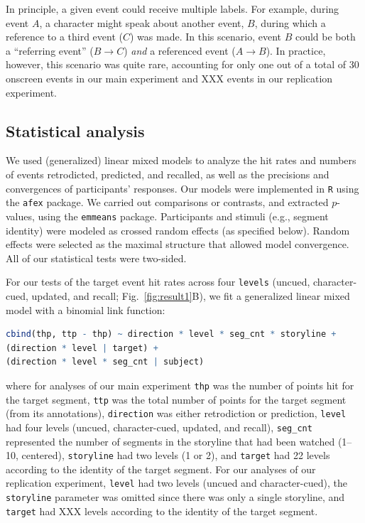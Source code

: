 \documentclass[10pt]{article}
\begin{document}
In principle, a given event could receive multiple labels. For example, during event $A$, a character might speak about another event, $B$, during which a reference to a third event ($C$) was made. In this scenario, event $B$ could be both a ``referring event'' ($B \rightarrow C$) \textit{and} a referenced event ($A \rightarrow B$). In practice, however, this scenario was quite rare, accounting for only one out of a total of 30 onscreen events in our main experiment and XXX events in our replication experiment.

\subsection*{Statistical analysis}

We used (generalized) linear mixed models to analyze the hit rates and numbers of events retrodicted, predicted, and recalled, as well as the precisions and convergences of participants' responses. Our models were implemented in \texttt{R} using the \texttt{afex} package. We carried out comparisons or contrasts, and extracted $p$-values, using the \texttt{emmeans} package. Participants and stimuli (e.g., segment identity) were modeled as crossed random effects (as specified below). Random effects were selected as the maximal structure that allowed model convergence. All of our statistical tests were two-sided.

For our tests of the target event hit rates across four \texttt{levels} (uncued, character-cued, updated, and recall; Fig.~\ref{fig:result1}B), we fit a generalized linear mixed model with a binomial link function:
\begin{lstlisting}[language=R]
  cbind(thp, ttp - thp) ~ direction * level * seg_cnt * storyline +
(direction * level | target) +
(direction * level * seg_cnt | subject)
\end{lstlisting}
where for analyses of our main experiment \texttt{thp} was the number of points hit for the target segment, \texttt{ttp} was the total number of points for the target segment (from its annotations), \texttt{direction} was either retrodiction or prediction, \texttt{level} had four levels (uncued, character-cued, updated, and recall), \texttt{seg\_cnt} represented the number of segments in the storyline that had been watched (1--10, centered), \texttt{storyline} had two levels (1 or 2), and \texttt{target} had 22 levels according to the identity of the target segment. For our analyses of our replication experiment, \texttt{level} had two levels (uncued and character-cued), the \texttt{storyline} parameter was omitted since there was only a single storyline, and \texttt{target} had XXX levels according to the identity of the target segment.
\end{document}

